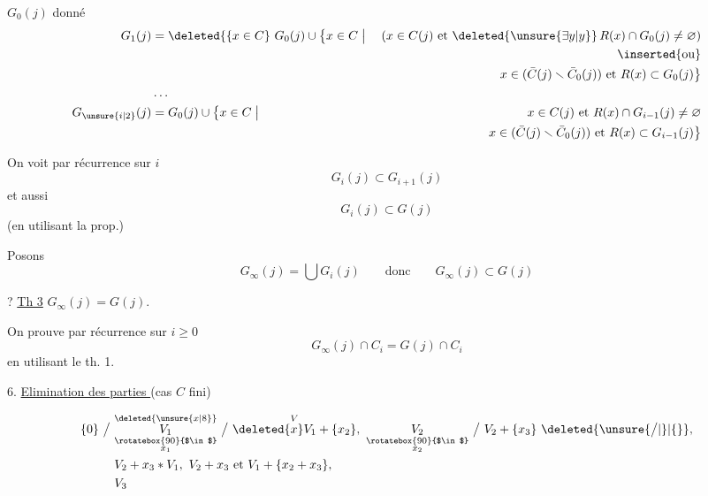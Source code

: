 
$G_0(j)$ donné
\[
\begin{aligned}
G_1(j)={}&\deleted{\{x\in C}\ G_0(j)\cup\bigl\{x\in C\bigm|{}&
 (x\in C(j)\text{ et }\deleted{\unsure{\exists y|y}}\, R(x)\cap G_0(j)\ne\varnothing)\\
&&\inserted{\text{ou}}\\
&&x\in(\bar C(j)\smallsetminus\bar C_0(j))\text{ et } R(x)\subset G_0(j)\bigr\}\\
\ldots\\
G_{\unsure{i|2}}(j)={}&G_0(j)\cup\bigl\{x\in C\bigm|{}&
 x\in C(j)\text{ et }R(x)\cap G_{i-1}(j)\ne\varnothing\\
&&x\in(\bar C(j)\smallsetminus\bar C_0(j))\text{ et }R(x)\subset G_{i-1}(j)\bigr\}
\end{aligned}
\]

On voit par récurrence sur $i$
\[
G_i(j)\subset G_{i+1}(j)
\]
et aussi
\[
G_i(j)\subset G(j)
\]
(en utilisant la prop.)

Posons
\[
G_\infty(j)=\bigcup G_i(j)\qquad\text{donc}\qquad G_\infty(j)\subset G(j)
\]

? \uline{Th 3} $G_\infty(j)=G(j)$.




On prouve par récurrence sur $i\geq0$
\[
G_\infty(j)\cap C_i=G(j)\cap C_i
\]
en utilisant le th. 1.


6. \uline{Elimination des parties  } (cas $C$ fini)


\[
\begin{aligned}
\{0\}\ \big/\ &\overset{\deleted{\unsure{x|8}}}{\underset{\substack{\rotatebox{90}{$\in$}\\x_1}}{V_1}}\ \big/\ 
\overset{V}{\deleted{x}V_1+\{x_2\}},\ \underset{\substack{\rotatebox{90}{$\in$}\\x_2}}{V_2}\ \big/\ V_2+\{x_3\}\ \deleted{\unsure{\big/|\}|\{}},\\
&V_2+x_3\ast{}V_1,\ V_2+x_3\text{ et }V_1+\{x_2+x_3\},\\
&\hfill V_3
\end{aligned}
\]

